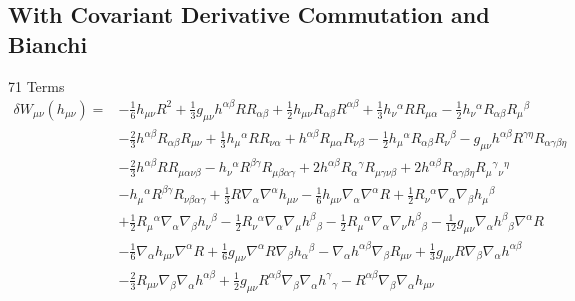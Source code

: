 \documentclass[10pt,letterpaper]{article}
\begin{document}
\subsection*{With Covariant Derivative Commutation and Bianchi}
71 Terms
\begin{align}
\delta W_{\mu\nu}(h_{\mu\nu})={}&- \tfrac{1}{6} h_{\mu \nu} R^2
 + \tfrac{1}{3} g_{\mu \nu} h^{\alpha \beta} R R_{\alpha \beta}
 + \tfrac{1}{2} h_{\mu \nu} R_{\alpha \beta} R^{\alpha \beta}
 + \tfrac{1}{3} h_{\nu}{}^{\alpha} R R_{\mu \alpha}
 -  \tfrac{1}{2} h_{\nu}{}^{\alpha} R_{\alpha \beta} R_{\mu}{}^{\beta}\nonumber\\
& -  \tfrac{2}{3} h^{\alpha \beta} R_{\alpha \beta} R_{\mu \nu}
 + \tfrac{1}{3} h_{\mu}{}^{\alpha} R R_{\nu \alpha}
 + h^{\alpha \beta} R_{\mu \alpha} R_{\nu \beta}
 -  \tfrac{1}{2} h_{\mu}{}^{\alpha} R_{\alpha \beta} R_{\nu}{}^{\beta}
 -  g_{\mu \nu} h^{\alpha \beta} R^{\gamma \eta} R_{\alpha \gamma \beta \eta}\nonumber\\
& -  \tfrac{2}{3} h^{\alpha \beta} R R_{\mu \alpha \nu \beta}
 -  h_{\nu}{}^{\alpha} R^{\beta \gamma} R_{\mu \beta \alpha \gamma}
 + 2 h^{\alpha \beta} R_{\alpha}{}^{\gamma} R_{\mu \gamma \nu \beta}
 + 2 h^{\alpha \beta} R_{\alpha \gamma \beta \eta} R_{\mu}{}^{\gamma}{}_{\nu}{}^{\eta}\nonumber\\
& -  h_{\mu}{}^{\alpha} R^{\beta \gamma} R_{\nu \beta \alpha \gamma}
 + \tfrac{1}{3} R \nabla_{\alpha}\nabla^{\alpha}h_{\mu \nu}
 -  \tfrac{1}{6} h_{\mu \nu} \nabla_{\alpha}\nabla^{\alpha}R
 + \tfrac{1}{2} R_{\nu}{}^{\alpha} \nabla_{\alpha}\nabla_{\beta}h_{\mu}{}^{\beta}\nonumber\\
& + \tfrac{1}{2} R_{\mu}{}^{\alpha} \nabla_{\alpha}\nabla_{\beta}h_{\nu}{}^{\beta}
 -  \tfrac{1}{2} R_{\nu}{}^{\alpha} \nabla_{\alpha}\nabla_{\mu}h^{\beta}{}_{\beta}
 -  \tfrac{1}{2} R_{\mu}{}^{\alpha} \nabla_{\alpha}\nabla_{\nu}h^{\beta}{}_{\beta}
 -  \tfrac{1}{12} g_{\mu \nu} \nabla_{\alpha}h^{\beta}{}_{\beta} \nabla^{\alpha}R\nonumber\\
& -  \tfrac{1}{6} \nabla_{\alpha}h_{\mu \nu} \nabla^{\alpha}R
 + \tfrac{1}{6} g_{\mu \nu} \nabla^{\alpha}R \nabla_{\beta}h_{\alpha}{}^{\beta}
 -  \nabla_{\alpha}h^{\alpha \beta} \nabla_{\beta}R_{\mu \nu}
 + \tfrac{1}{3} g_{\mu \nu} R \nabla_{\beta}\nabla_{\alpha}h^{\alpha \beta}\nonumber\\
& -  \tfrac{2}{3} R_{\mu \nu} \nabla_{\beta}\nabla_{\alpha}h^{\alpha \beta}
 + \tfrac{1}{2} g_{\mu \nu} R^{\alpha \beta} \nabla_{\beta}\nabla_{\alpha}h^{\gamma}{}_{\gamma}
 -  R^{\alpha \beta} \nabla_{\beta}\nabla_{\alpha}h_{\mu \nu}

\end{align}
\end{document}

